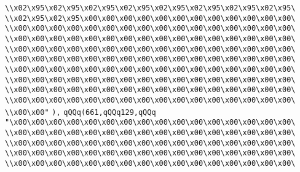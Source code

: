 \verb|\\x02\x95\x02\x95\x02\x95\x02\x95\x02\x95\x02\x95\x02\x95\x02\x95\|\newline
\verb|\\x02\x95\x02\x95\x00\x00\x00\x00\x00\x00\x00\x00\x00\x00\x00\x00\|\newline
\verb|\\x00\x00\x00\x00\x00\x00\x00\x00\x00\x00\x00\x00\x00\x00\x00\x00\|\newline
\verb|\\x00\x00\x00\x00\x00\x00\x00\x00\x00\x00\x00\x00\x00\x00\x00\x00\|\newline
\verb|\\x00\x00\x00\x00\x00\x00\x00\x00\x00\x00\x00\x00\x00\x00\x00\x00\|\newline
\verb|\\x00\x00\x00\x00\x00\x00\x00\x00\x00\x00\x00\x00\x00\x00\x00\x00\|\newline
\verb|\\x00\x00\x00\x00\x00\x00\x00\x00\x00\x00\x00\x00\x00\x00\x00\x00\|\newline
\verb|\\x00\x00\x00\x00\x00\x00\x00\x00\x00\x00\x00\x00\x00\x00\x00\x00\|\newline
\verb|\\x00\x00\x00\x00\x00\x00\x00\x00\x00\x00\x00\x00\x00\x00\x00\x00\|\newline
\verb|\\x00\x00\x00\x00\x00\x00\x00\x00\x00\x00\x00\x00\x00\x00\x00\x00\|\newline
\verb|\\x00\x00"|\newline
\verb|),|\newline
\verb|qQQq(661,qQQq129,qQQq|\newline
\verb|"\x00\x00\x00\x00\x00\x00\x00\x00\x00\x00\x00\x00\x00\x00\x00\x00\|\newline
\verb|\\x00\x00\x00\x00\x00\x00\x00\x00\x00\x00\x00\x00\x00\x00\x00\x00\|\newline
\verb|\\x00\x00\x00\x00\x00\x00\x00\x00\x00\x00\x00\x00\x00\x00\x00\x00\|\newline
\verb|\\x00\x00\x00\x00\x00\x00\x00\x00\x00\x00\x00\x00\x00\x00\x00\x00\|\newline
\verb|\\x00\x00\x00\x00\x00\x00\x00\x00\x00\x00\x00\x00\x00\x00\x00\x00\|\newline
